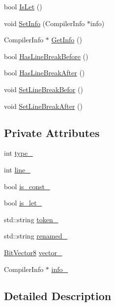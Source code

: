 \begin{DoxyCompactItemize}
bool \hyperlink{classmocha_1_1_token_info_a87134e10814db095ad146c695341894c}{IsLet} ()
\item 
void \hyperlink{classmocha_1_1_token_info_a1488308e8f9569e460f0baaed2bbd5d8}{SetInfo} (CompilerInfo $\ast$info)
\item 
CompilerInfo $\ast$ \hyperlink{classmocha_1_1_token_info_ac41de71a7cddeeb869d0fc36db99136f}{GetInfo} ()
\item 
bool \hyperlink{classmocha_1_1_token_info_a1875ee8d986b92978b4c434107201e66}{HasLineBreakBefore} ()
\item 
bool \hyperlink{classmocha_1_1_token_info_a9281f5382cb27af7832eb9c871bcf6b3}{HasLineBreakAfter} ()
\item 
void \hyperlink{classmocha_1_1_token_info_a8ce4e792e1c8c9a900e97d5d9e904c7e}{SetLineBreakBefor} ()
\item 
void \hyperlink{classmocha_1_1_token_info_a01b1a3b7f2792fe3fa6380288ca7a004}{SetLineBreakAfter} ()
\end{DoxyCompactItemize}
\subsection*{Private Attributes}
\begin{DoxyCompactItemize}
\item 
int \hyperlink{classmocha_1_1_token_info_a20cafafc8e332f6182184b70fe147c2c}{type\_\-}
\item 
int \hyperlink{classmocha_1_1_token_info_a507eaae686fcf08cb5504117ce660a1b}{line\_\-}
\item 
bool \hyperlink{classmocha_1_1_token_info_aba23d888206ca283bcb9e51100ca49ee}{is\_\-const\_\-}
\item 
bool \hyperlink{classmocha_1_1_token_info_a6d1ecdd8db574d8244da19b7553ab932}{is\_\-let\_\-}
\item 
std::string \hyperlink{classmocha_1_1_token_info_ae8fb5a3f94285db1e14ddd222d874166}{token\_\-}
\item 
std::string \hyperlink{classmocha_1_1_token_info_af154824b9fca9aec8c462d6d3bb74c56}{renamed\_\-}
\item 
\hyperlink{classmocha_1_1_bit_vector}{BitVector8} \hyperlink{classmocha_1_1_token_info_a2a502ef536ae68253e3cb98ef2854a99}{vector\_\-}
\item 
CompilerInfo $\ast$ \hyperlink{classmocha_1_1_token_info_a01f9f92c6a6b74432d284a079b1f656c}{info\_\-}
\end{DoxyCompactItemize}


\subsection{Detailed Description}


